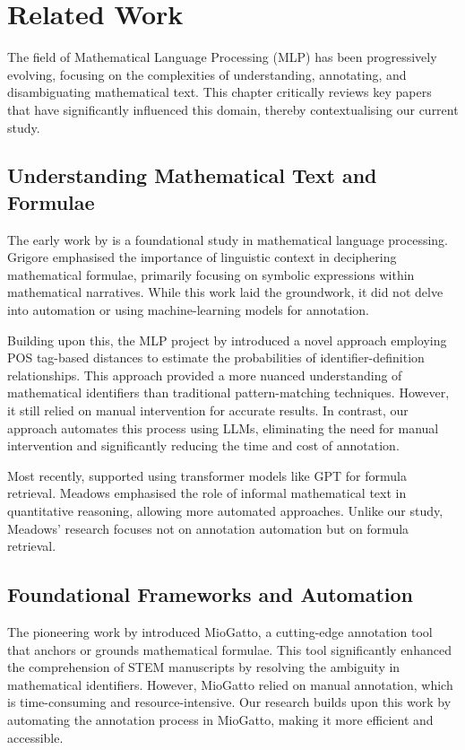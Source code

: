 \chapter{Related Work}\label{chapter:related_work}

The field of Mathematical Language Processing (MLP) has been progressively evolving, focusing on the complexities of understanding, annotating, and disambiguating mathematical text. This chapter critically reviews key papers that have significantly influenced this domain, thereby contextualising our current study.

\section{Understanding Mathematical Text and Formulae}

The early work by \citet{grigore2009towards} is a foundational study in mathematical language processing. Grigore emphasised the importance of linguistic context in deciphering mathematical formulae, primarily focusing on symbolic expressions within mathematical narratives. While this work laid the groundwork, it did not delve into automation or using machine-learning models for annotation.

Building upon this, the MLP project by \citet{pagael2014mathematical} introduced a novel approach employing \ac{POS} tag-based distances to estimate the probabilities of identifier-definition relationships. This approach provided a more nuanced understanding of mathematical identifiers than traditional pattern-matching techniques. However, it still relied on manual intervention for accurate results. In contrast, our approach automates this process using LLMs, eliminating the need for manual intervention and significantly reducing the time and cost of annotation.

Most recently, \citet{meadows2022survey} supported using transformer models like GPT for formula retrieval. Meadows emphasised the role of informal mathematical text in quantitative reasoning, allowing more automated approaches. Unlike our study, Meadows' research focuses not on annotation automation but on formula retrieval.

\section{Foundational Frameworks and Automation}

The pioneering work by \citet{asakura2020towards} introduced MioGatto, a cutting-edge annotation tool that anchors or grounds mathematical formulae. This tool significantly enhanced the comprehension of STEM manuscripts by resolving the ambiguity in mathematical identifiers. However, MioGatto relied on manual annotation, which is time-consuming and resource-intensive. Our research builds upon this work by automating the annotation process in MioGatto, making it more efficient and accessible.


